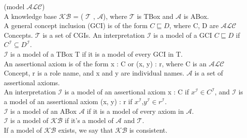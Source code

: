 \begin{mydef} \cite{handbook2} (model $\mathcal{ALC}$)\\
A knowledge base $\mathcal{KB}$ = ( $ \mathcal{T} $ , $ \mathcal{A} $), where $\mathcal{T}$ is TBox and $\mathcal{A}$ is ABox.\\
A general concept inclusion (GCI) is of the form $C \sqsubseteq D$, where C, D
are $\mathcal{ALC}$ Concepts. $\mathcal{T}$ is a set of CGIs. An interpretation $\mathcal{I}$ is a model
of a GCI $C \sqsubseteq D$ if $C^\mathcal{I} \subseteq D^\mathcal{I}$.\\ $\mathcal{I}$ is a model of a TBox T if it is a model of every GCI
in T. \\
An assertional axiom is of the form x : C or (x, y) : r, where C is
an $\mathcal{ALC}$ Concept, r is a role name, and x and y are individual names. $\mathcal{A}$ is a set of assertional axioms. \\
An interpretation $\mathcal{I}$ is a model of an assertional 
axiom x : C if $x^\mathcal{I} \in C^\mathcal{I}$, and $\mathcal{I}$ is a model of an assertional axiom (x, y) : r if
$x^\mathcal{I}$,$y^\mathcal{I} \in r^\mathcal{I}$.\\ $\mathcal{I}$ is a model of an ABox $\mathcal{A}$ if it is a model of every axiom in $\mathcal{A}$. \\
$\mathcal{I}$ is a model of $\mathcal{KB}$ if it's a model of $\mathcal{A}$ and $\mathcal{T}$. \\
If a model of $\mathcal{KB}$ exists, we say that $\mathcal{KB}$ is consistent.
\end{mydef}
